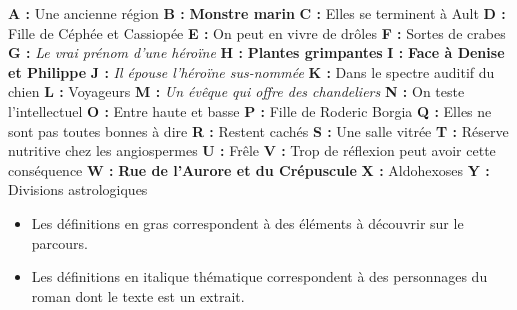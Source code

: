 \documentclass[11pt]{article}
\begin{document}
\textbf{ A :} Une ancienne région
\textbf{ B :} \textbf{Monstre marin}
\textbf{ C :} Elles se terminent à Ault
\textbf{ D :} Fille de Céphée et Cassiopée
\textbf{ E :} On peut en vivre de drôles
\textbf{ F :} Sortes de crabes
\textbf{ G :} \textit{Le vrai prénom d'une héroïne}
\textbf{ H :} \textbf{Plantes grimpantes}
\textbf{ I :} \textbf{Face à Denise et Philippe}
\textbf{ J :} \textit{Il épouse l'héroïne sus-nommée}
\textbf{ K :} Dans le spectre auditif du chien
\textbf{ L :} Voyageurs
\textbf{ M :} \textit{Un évêque qui offre des chandeliers}
\textbf{ N :} On teste l'intellectuel
\textbf{ O :} Entre haute et basse
\textbf{ P :} Fille de Roderic Borgia
\textbf{ Q :} Elles ne sont pas toutes bonnes à dire
\textbf{ R :} Restent cachés
\textbf{ S :} Une salle vitrée
\textbf{ T :} Réserve nutritive chez les angiospermes
\textbf{ U :} Frêle
\textbf{ V :} Trop de réflexion peut avoir cette conséquence
\textbf{ W :} \textbf{Rue de l'Aurore et du Crépuscule}
\textbf{ X :} Aldohexoses
\textbf{ Y :} Divisions astrologiques

\begin{itemize}
\item Les définitions en gras correspondent à des éléments à découvrir sur le parcours.
\item Les définitions en italique thématique correspondent à des personnages du roman dont le texte est un extrait.
\end{itemize}
\end{document}
